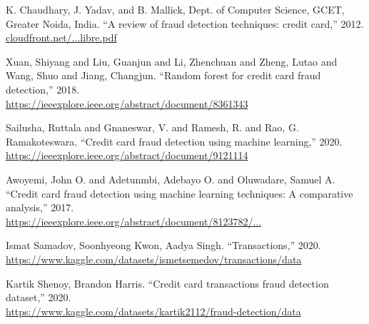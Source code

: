 \documentclass[conference]{IEEEtran}
\begin{document}
\begin{thebibliography}{99}

K. Chaudhary, J. Yadav, and B. Mallick, Dept. of Computer Science, GCET, Greater Noida, India. ``A review of fraud detection techniques: credit card,'' 2012. \href{https://d1wqtxts1xzle7.cloudfront.net/74530838/pxc3878991-libre.pdf?1636648580=&response-content-disposition=inline%3B+filename%3DA_review_of_Fraud_Detection_Techniques_C.pdf&Expires=1745510471&Signature=YcBJAmZm~XRNUlp0ZgYoKpNDj1OgjLYGHCEFPXtB6xIspkQyxp0Oh7gMxJJ20hWEDdy0OLL2yxZmrSQRyy3IkygJQ7Njt1JwyTW8qJirZ8ClKnKnM0ZkTDV8JVlHMlWrQjTc~nTOQ9zZZhLtQwaCDuW~pC27fYhbgKqHqUYx-6YehYvANl0zcfTLy5tI~yA89LNvAxVUbME66VOAX6CBtFonZ~ha6Gp-FRyvAsII54aLdh5-ymGuMELYDjWtO-pFAPyJDAsd8afdq~sPlDUJwZD-E5-aYqeszHpCrGBC0RtCY8dNGhuxgnP7teBz2oXwfR5YwYGo~gMcQabIH2KPhg__&Key-Pair-Id=APKAJLOHF5GGSLRBV4ZA}{cloudfront.net/...libre.pdf}

Xuan, Shiyang and Liu, Guanjun and Li, Zhenchuan and Zheng, Lutao and Wang, Shuo and Jiang, Changjun. ``Random forest for credit card fraud detection,'' 2018.\\
\href{https://ieeexplore.ieee.org/abstract/document/8361343}{https://ieeexplore.ieee.org/abstract/document/8361343}

Sailusha, Ruttala and Gnaneswar, V. and Ramesh, R. and Rao, G. Ramakoteswara. ``Credit card fraud detection using machine learning,'' 2020.\\
\href{https://ieeexplore.ieee.org/abstract/document/9121114}{https://ieeexplore.ieee.org/abstract/document/9121114}


Awoyemi, John O. and Adetunmbi, Adebayo O. and Oluwadare, Samuel A. ``Credit card fraud detection using machine learning techniques: A comparative analysis,'' 2017.\\
\href{https://ieeexplore.ieee.org/abstract/document/8123782?casa_token=agN3nFNpjkkAAAAA:Y0GKH4PXeCQjLyvXOHGsm9uILsQ40S1yi6Dw_p4rrsvVLYY78ronmk5yZS31tHM5uI7x7BPu}{https://ieeexplore.ieee.org/abstract/document/8123782/...}

Ismat Samadov, Soonhyeong Kwon, Aadya Singh. ``Transactions,'' 2020.\\
\href{https://www.kaggle.com/datasets/ismetsemedov/transactions/data}{https://www.kaggle.com/datasets/ismetsemedov/transactions/data}

Kartik Shenoy, Brandon Harris. ``Credit card transactions fraud detection dataset,'' 2020.\\
\href{https://www.kaggle.com/datasets/kartik2112/fraud-detection/data}{https://www.kaggle.com/datasets/kartik2112/fraud-detection/data}


\end{thebibliography}
\end{document}
